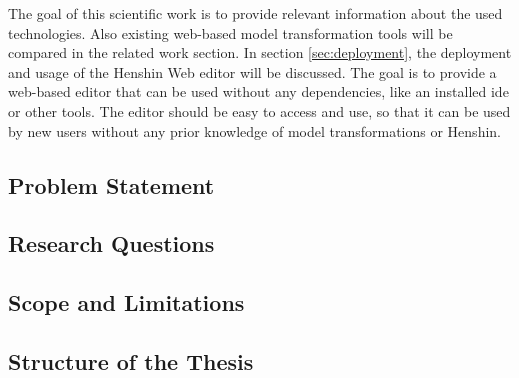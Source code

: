 The goal of this scientific work is to provide relevant information about the used technologies. Also existing web-based model transformation tools will be compared in the related work section. In section \ref{sec:deployment}, the deployment and usage of the Henshin Web editor will be discussed. The goal is to provide a web-based editor that can be used without any dependencies, like an installed \acs{ide} or other tools. The editor should be easy to access and use, so that it can be used by new users without any prior knowledge of model transformations or Henshin.

\subsection{Problem Statement}
\label{subsec:problem-statement}

\subsection{Research Questions}
\label{subsec:research-questions}

\subsection{Scope and Limitations}
\label{subsec:scope-limitations}

\subsection{Structure of the Thesis}
\label{subsec:structure-thesis}